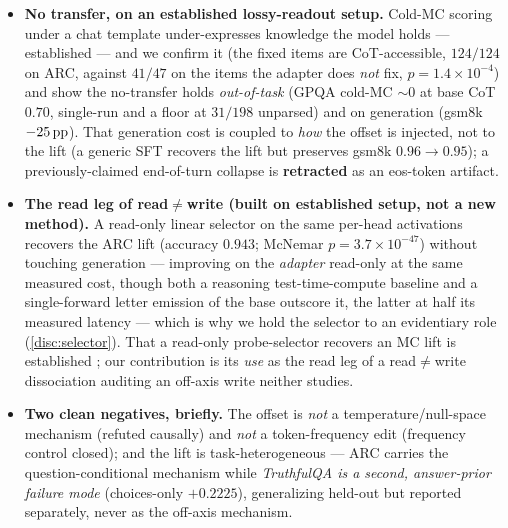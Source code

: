 \begin{itemize}[leftmargin=1.4em,itemsep=3pt]
  learned and privileged, not any perturbation of the right size. The perpendicular
  push recovers ${\sim}100\%$, but since the offset is already nearly
  all-perpendicular that arm is close to tautological (\cref{disc:geometry}); the
  parallel and shuffle arms carry the identification. The net-effect comparison is
  a method-dependent spectrum (contrastive cosine $0.088$ vs generic SFT $0.199$),
  and the lift has no layer locus (it scales with offset magnitude, correlation
  $0.985$); a training-time on-axis penalty does not rescue transfer (see
  \cref{sec:limitations}), adding \emph{necessity} to this sufficiency.
\item \textbf{No transfer, on an established lossy-readout setup.} Cold-MC scoring
  under a chat template under-expresses knowledge the model holds --- established
  \citep{ConfidenceManifold,InsideOut,KAPPA} --- and we confirm it (the fixed items
  are CoT-accessible, $124/124$ on ARC, against $41/47$ on the items the adapter
  does \emph{not} fix, $p=1.4\times10^{-4}$) and show the no-transfer holds
  \emph{out-of-task} (GPQA cold-MC ${\sim}0$ at base CoT $0.70$, single-run and a
  floor at $31/198$ unparsed) and on
  generation (gsm8k $-25\,\mathrm{pp}$). That generation cost is coupled to \emph{how} the
  offset is injected, not to the lift (a generic SFT recovers the lift but
  preserves gsm8k $0.96{\rightarrow}0.95$); a previously-claimed end-of-turn
  collapse is \textbf{retracted} as an eos-token artifact.
\item \textbf{The read leg of read${\neq}$write (built on established setup, not a
  new method).} A read-only linear selector on the same per-head activations
  recovers the ARC lift (accuracy $0.943$; McNemar $p=3.7\times10^{-47}$) without
  touching generation --- improving on the \emph{adapter} read-only at the same
  measured cost, though both a reasoning test-time-compute baseline and a
  single-forward letter emission of the base outscore it, the latter at half its
  measured latency --- which is why we hold the selector to an evidentiary role
  (\cref{disc:selector}). That a
  read-only probe-selector recovers an MC lift is established
  \citep{NoVo,CORAL}; our contribution is its \emph{use} as the read leg of a
  read${\neq}$write dissociation auditing an off-axis write neither studies.
\item \textbf{Two clean negatives, briefly.} The offset is \emph{not} a
  temperature/null-space mechanism (refuted causally) and \emph{not} a
  token-frequency edit (frequency control closed); and the lift is
  task-heterogeneous --- ARC carries the question-conditional mechanism while
  \emph{TruthfulQA is a second, answer-prior failure mode} (choices-only
  $+0.2225$), generalizing held-out but reported separately, never as the off-axis
  mechanism.
\end{itemize}

